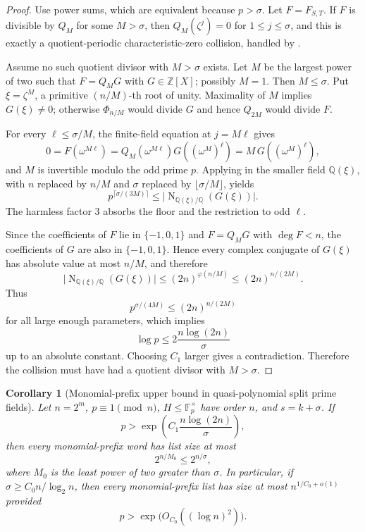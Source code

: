 \documentclass[11pt]{article}
\newtheorem{corollary}[corollary]{Corollary}
\theoremstyle{definition}
\newcommand{\F}{\mathbb F}
\newcommand{\Z}{\mathbb Z}
\newcommand{\Q}{\mathbb Q}
\newcommand{\Norm}{\operatorname{N}}
\begin{document}
\begin{proof}
Use power sums, which are equivalent because $p>\sigma$.  Let $F=F_{S,T}$.  If $F$ is divisible by $Q_M$ for some $M>\sigma$, then $Q_M(\zeta^j)=0$ for $1\le j\le\sigma$, and this is exactly a quotient-periodic characteristic-zero collision, handled by .

Assume no such quotient divisor with $M>\sigma$ exists.  Let $M$ be the largest power of two such that $F=Q_MG$ with $G\in\Z[X]$; possibly $M=1$.  Then $M\le\sigma$.  Put $\xi=\zeta^M$, a primitive $(n/M)$-th root of unity.  Maximality of $M$ implies $G(\xi)\ne0$; otherwise $\Phi_{n/M}$ would divide $G$ and hence $Q_{2M}$ would divide $F$.

For every $\ell\le\sigma/M$, the finite-field equation at $j=M\ell$ gives
\[
        0=F(\omega^{M\ell})=Q_M(\omega^{M\ell})G((\omega^M)^\ell)=M\,G((\omega^M)^\ell),
\]
and $M$ is invertible modulo the odd prime $p$.  Applying  in the smaller field $\Q(\xi)$, with $n$ replaced by $n/M$ and $\sigma$ replaced by $\lfloor\sigma/M\rfloor$, yields
\[
        p^{\lceil\sigma/(3M)\rceil}\le \big|\Norm_{\Q(\xi)/\Q}(G(\xi))\big|.
\]
The harmless factor $3$ absorbs the floor and the restriction to odd $\ell$.

Since the coefficients of $F$ lie in $\{-1,0,1\}$ and $F=Q_MG$ with $\deg F<n$, the coefficients of $G$ are also in $\{-1,0,1\}$.  Hence every complex conjugate of $G(\xi)$ has absolute value at most $n/M$, and therefore
\[
        \big|\Norm_{\Q(\xi)/\Q}(G(\xi))\big|
        \le (2n)^{\varphi(n/M)}
        \le (2n)^{n/(2M)}.
\]
Thus
\[
        p^{\sigma/(4M)}\le (2n)^{n/(2M)}
\]
for all large enough parameters, which implies
\[
        \log p\le 2\frac{n\log(2n)}{\sigma}
\]
up to an absolute constant.  Choosing $C_1$ larger gives a contradiction.  Therefore the collision must have had a quotient divisor with $M>\sigma$.
\end{proof}

\begin{corollary}[Monomial-prefix upper bound in quasi-polynomial split prime fields]\label{cor:quasipoly-upper}
Let $n=2^m$, $p\equiv1\pmod n$, $H\le\F_p^\times$ have order $n$, and $s=k+\sigma$.  If
\[
        p>\exp\!\left(C_1\frac{n\log(2n)}{\sigma}\right),
\]
then every monomial-prefix word has list size at most
\[
        2^{n/M_0}\le 2^{n/\sigma},
\]
where $M_0$ is the least power of two greater than $\sigma$.  In particular, if $\sigma\ge C_0n/\log_2n$, then every monomial-prefix list has size at most $n^{1/C_0+o(1)}$ provided
\[
        p>\exp\big(O_{C_0}((\log n)^2)\big).
\]
\end{corollary}
\end{document}
